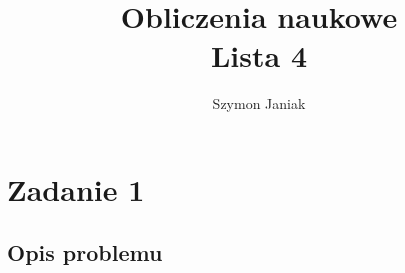 \documentclass{article}
\title{%
	Obliczenia naukowe \\
	\large Lista 4}
\author{Szymon Janiak}
\begin{document}
\maketitle

\section*{Zadanie 1}
\subsection*{Opis problemu}
\end{document}
